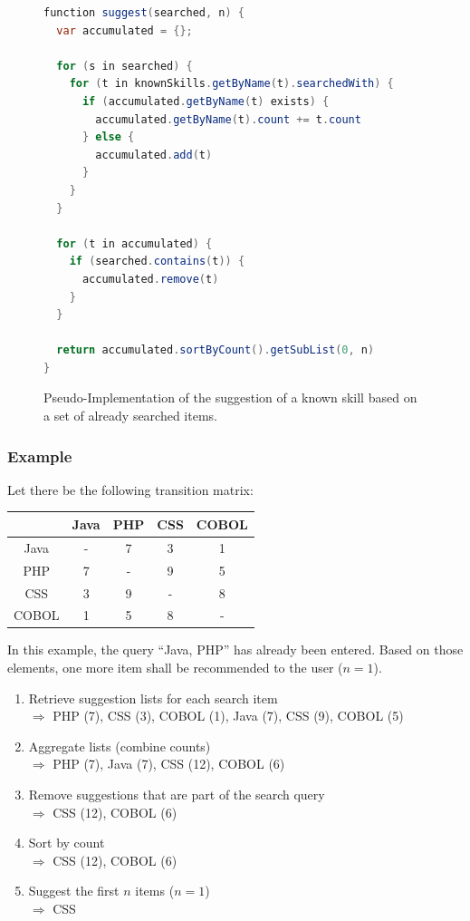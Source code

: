 \newpage

\begin{figure}[!htp]
\begin{lstlisting}[language=Java]
function suggest(searched, n) {
  var accumulated = {};

  for (s in searched) {
    for (t in knownSkills.getByName(t).searchedWith) {
      if (accumulated.getByName(t) exists) {
        accumulated.getByName(t).count += t.count
      } else {
        accumulated.add(t)
      }
    }
  }

  for (t in accumulated) {
    if (searched.contains(t)) {
      accumulated.remove(t)
    }
  }

  return accumulated.sortByCount().getSubList(0, n)
}

\end{lstlisting}
\caption[Pseudocode: Skill Suggestion Algorithm]{Pseudo-Implementation of the suggestion of a known skill based on a set of already searched items.}
\end{figure}

\newpage

\subsubsection{Example}
Let there be the following transition matrix:

\begin{center}
\begin{tabular}{c | c |c | c | c}
		  & Java & PHP & CSS & COBOL\\
	\hline
	Java  &  -   &  7  &  3  &   1  \\
	\hline
	PHP   &  7   &  -  &  9  &   5  \\
	\hline
	CSS   &  3   &  9  &  -  &   8  \\
	\hline
	COBOL &  1   &  5  &  8  &   -  \\
\end{tabular}
\end{center}

In this example, the query ``Java, PHP'' has already been entered. Based on those elements, one more item shall be recommended to the user ($n = 1$).
\begin{enumerate}
	\item Retrieve suggestion lists for each search item\\
		$\Rightarrow$ PHP (7), CSS (3), COBOL (1), Java (7), CSS (9), COBOL (5)
	\item Aggregate lists (combine counts)\\
		$\Rightarrow$ PHP (7), Java (7), CSS (12), COBOL (6)
	\item Remove suggestions that are part of the search query\\
		$\Rightarrow$ CSS (12), COBOL (6)
	\item Sort by count\\
		$\Rightarrow$ CSS (12), COBOL (6)
	\item Suggest the first $n$ items ($n = 1$)\\
		$\Rightarrow$ CSS
\end{enumerate}

